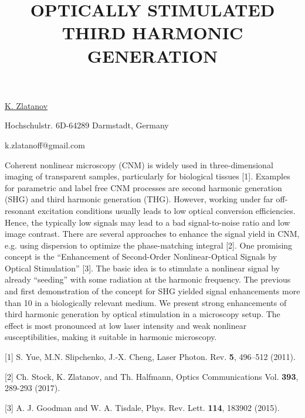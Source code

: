 \title{OPTICALLY STIMULATED THIRD HARMONIC GENERATION}

\underline{K. Zlatanov} 

{\normalsize{\vspace{-4mm}
Hochschulstr. 6D-64289 Darmstadt, Germany



\email k.zlatanoff@gmail.com}}


Coherent nonlinear microscopy (CNM) is widely used in three-dimensional imaging of transparent samples, particularly for biological tissues [1]. Examples for parametric and label free CNM processes are second harmonic generation (SHG) and third harmonic generation (THG). However, working under far off-resonant excitation conditions usually leads to low optical conversion efficiencies. Hence, the typically low signals may lead to a bad signal-to-noise ratio and low image contrast. There are several approaches to enhance the signal yield in CNM, e.g. using dispersion to optimize the phase-matching integral [2]. One promising concept is the ``Enhancement of Second-Order Nonlinear-Optical Signals by Optical Stimulation'' [3]. The basic idea is to stimulate a nonlinear signal by already ``seeding'' with some radiation at the harmonic frequency. The previous and first demonstration of the concept for SHG yielded signal enhancements more than 10 in a biologically relevant medium. We present strong enhancements of third harmonic generation by optical stimulation in a microscopy setup. The effect is most pronounced at low laser intensity and weak nonlinear susceptibilities, making it suitable in harmonic microscopy.

{\normalsize
[1] S. Yue, M.N. Slipchenko, J.-X. Cheng, Laser Photon. Rev. \textbf{5}, 496–512 (2011).
\vsp

[2] Ch. Stock, K. Zlatanov, and Th. Halfmann, Optics Communications Vol. \textbf{393}, 289-293 (2017).
\vsp

[3] A. J. Goodman and W. A. Tisdale, Phys. Rev. Lett. \textbf{114}, 183902 (2015).
}

\vspace{\baselineskip}
